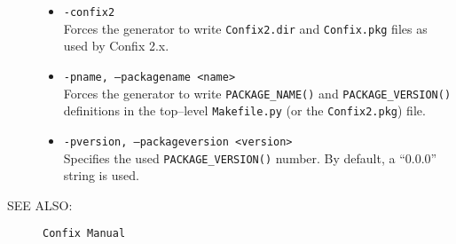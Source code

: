 \begin{description}
\begin{itemize}
  \item {\tt -confix2} \\
    Forces the generator to write {\tt Confix2.dir} and {\tt Confix.pkg} files as used by Confix 2.x.

  \item {\tt -pname, --packagename <name>} \\
  	Forces the generator to write {\tt PACKAGE\_NAME()} and  
	{\tt PACKAGE\_VERSION()} definitions in the top--level {\tt Makefile.py} (or the
	{\tt Confix2.pkg}) file.
  
  \item {\tt -pversion, --packageversion <version>} \\ 
    Specifies the used {\tt PACKAGE\_VERSION()} number. By default, a ``0.0.0'' string
    is used.
  \end{itemize}
    
\item [SEE ALSO:]
   {\tt Confix Manual}
\end{description}




